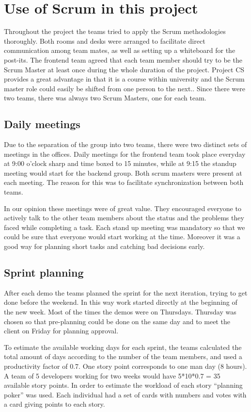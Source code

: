 \section{Use of Scrum in this project}
Throughout the project the teams tried to apply the Scrum methodologies thoroughly.
Both rooms and desks were arranged to facilitate direct communication among team mates, as well as setting up a whiteboard for the post-its. 
The frontend team agreed that each team member should try to
be the Scrum Master at least once during the whole duration of the project.
Project CS provides a great advantage in that it is a course within university and the Scrum master role could easily be shifted from one person to the next..
Since there were two teams, there was always two Scrum Masters, one for each team.

\subsection{Daily meetings}
Due to the separation of the group into two teams, there were two distinct sets of meetings in the offices.
Daily meetings for the frontend team took place everyday at 9:00 o'clock sharp and time boxed to 15 minutes,
while at 9:15 the standup meeting would start for the backend group.
Both scrum masters were present at each meeting.
The reason for this was to facilitate synchronization between both teams.

In our opinion these meetings were of great value. 
They encouraged everyone to actively talk to the other team members about
the status and the problems they faced while completing a task.
Each stand up meeting was mandatory so that we could be sure
that everyone would start working at the time. 
Moreover it was a good way for planning short tasks and catching bad decisions early.

\subsection{Sprint planning}
After each demo the teams planned the sprint for the next iteration, trying to get done before the weekend.
In this way work started directly at the beginning of the new week. Most of the times the demos were on Thursdays. Thursday was chosen so that pre-planning could be done on the same day and to meet the client on Friday for planning approval.

To estimate the available working days for each sprint, the teams calculated the total amount of days
according to the number of the team members, and used a productivity factor of 0.7. One story point corresponds to one man day (8 hours). A team of 5 developers working
for two weeks would have 5*10*0.7 = 35 available story points.
In order to estimate the workload of each story ``planning poker'' was used. Each individual had a set of cards
with numbers and votes with a card giving points to each story. 

